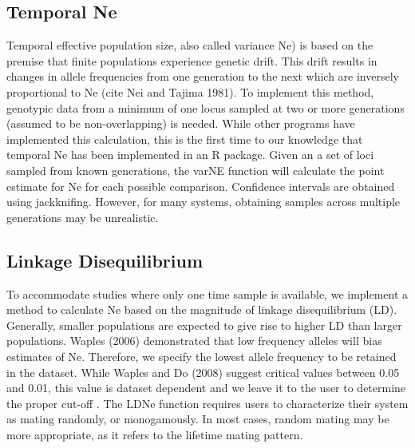 \documentclass[12pt,a4paper,titlepage]{article}
\begin{document}
\subsection*{Temporal Ne}

Temporal effective population size, also called variance Ne) is based on the premise that finite populations experience genetic drift. This drift results in changes in allele frequencies from one generation to the next which are inversely proportional to Ne (cite Nei and Tajima 1981). To implement this method, genotypic data from a minimum of one locus sampled at two or more generations (assumed to be non-overlapping) is needed. While other programs have implemented this calculation, this is the first time to our knowledge that temporal Ne has been implemented in an R package. Given an a set of loci sampled from known generations, the varNE function will calculate the point estimate for Ne for each possible comparison. Confidence intervals are obtained using jackknifing. However, for many systems, obtaining samples across multiple generations may be unrealistic.

\subsection*{Linkage Disequilibrium}

To accommodate studies where only one time sample is available, we implement a method to calculate Ne based on the magnitude of linkage disequilibrium (LD). Generally, smaller populations are expected to give rise to higher LD than larger populations. 
Waples (2006) demonstrated that low frequency alleles will bias estimates of Ne. Therefore, we specify the lowest allele frequency to be retained in the dataset.  While Waples and Do (2008) suggest critical values between 0.05 and 0.01, this value is dataset dependent and we leave it to the user to determine the proper cut-off \citep{Waples2010,Waples2008}. The LDNe function requires users to characterize their system as mating randomly, or monogamously. In most cases, random mating may be more appropriate, as it refers to the lifetime mating pattern. 
  

\end{document}
